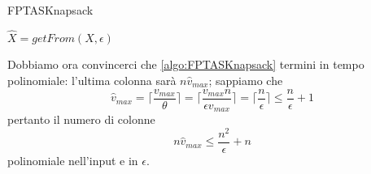 \begin{algorithm}
	\caption{FPTASKnapsack}
	\label{algo:FPTASKnapsack}

	$
		\hat{X} = getFrom(X, \epsilon)
	$


\end{algorithm}

Dobbiamo ora convincerci che \cref{algo:FPTASKnapsack} termini
in tempo polinomiale: l'ultima colonna sarà $n \hat{v}_{max}$;
sappiamo che
$$
	\hat{v}_{max} = \lceil \frac{v_{max}}{\theta} \rceil = \lceil \frac{v_{max} n}{\epsilon v_{max}} \rceil
	=\lceil \frac{n}{\epsilon}\rceil \leq \frac{n}{\epsilon} + 1
$$
pertanto il numero di colonne
$$
	n\hat{v}_{max} \leq \frac{n^2}{\epsilon} + n
$$
polinomiale nell'input e in $\epsilon$.




